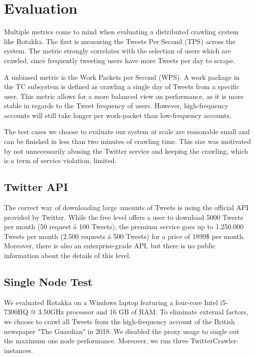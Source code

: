\documentclass{sigchi}
\begin{document}
\section{Evaluation}

Multiple metrics come to mind when evaluating a distributed crawling system like Rotakka. The first is measuring the Tweets Per Second (TPS) across the system. The metric strongly correlates with the selection of users which are crawled, since frequently tweeting users have more Tweets per day to scrape.

A unbiased metric is the Work Packets per Second (WPS). A work package in the TC subsystem is defined as crawling a single day of Tweets from a specific user. This metric allows for a more balanced view on performance, as it is more stable in regards to the Tweet frequency of users. However, high-frequency accounts will still take longer per work-packet than low-frequency accounts.

The test cases we choose to evaluate our system at scale are reasonable small and can be finished in less than two minutes of crawling time. This size was motivated by not unnecessarily abusing the Twitter service and keeping the crawling, which is a term of service violation, limited. 

\subsection{Twitter API}

The correct way of downloading large amounts of Tweets is using the official API provided by Twitter. While the free level offers a user to download 5000 Tweets per month (50 request \'{a} 100 Tweets), the premium service goes up to 1.250.000 Tweets per month (2.500 requests \'{a} 500 Tweets) for a price of 1899\$ per month. Moreover, there is also an enterprise-grade API, but there is no public information about the details of this level. \cite{twitter:pricing}

\subsection{Single Node Test}
We evaluated Rotakka on a Windows laptop featuring a four-core Intel i5-7300HQ @ 3.50GHz processor and 16 GB of RAM. To eliminate external factors, we choose to crawl all Tweets from the high-frequency account of the British newspaper "The Guardian" in 2018. We disabled the proxy usage to single out the maximum one node performance. Moreover, we run three TwitterCrawler-instances.
\end{document}
